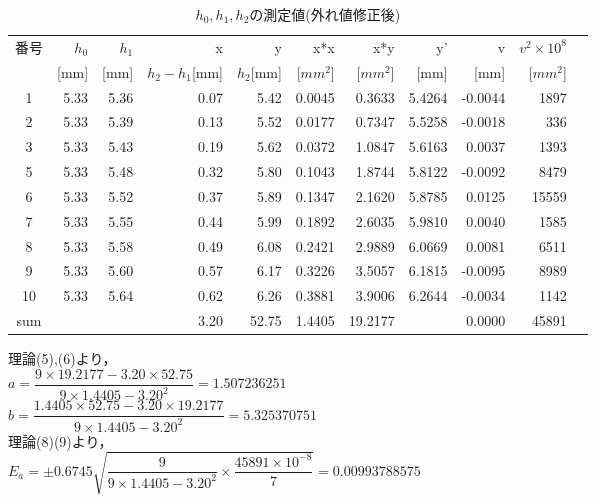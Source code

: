 \documentclass[a4paper,1pt]{jsarticle}
\begin{document}
\begin{table}[H]
  \caption{$h_0,h_1,h_2$の測定値(外れ値修正後)}
  \label{table:SpeedOfLight}
  \centering
  \begin{tabular}{|c||r|r|r|r|r|r|r|r|r|r|}
    \hline
    番号 & $h_0$ & $h_1$ & x & y & x*x & x*y & y' & v & $v^2\times10^8$\\
    &[mm] & [mm] & $h_2-h_1$[mm] & $h_2$[mm] & [$mm^2$] & [$mm^2$] & [mm] & [mm] & [$mm^2$]\\
    \hline \hline
    1 & 5.33 & 5.36 & 0.07 & 5.42 & 0.0045 & 0.3633 & 5.4264 & -0.0044 & 1897 \\
    2 & 5.33 & 5.39 & 0.13 & 5.52 & 0.0177 & 0.7347 & 5.5258 & -0.0018 & 336 \\
    3 & 5.33 & 5.43 & 0.19 & 5.62 & 0.0372 & 1.0847 & 5.6163 & 0.0037 & 1393 \\
    5 & 5.33 & 5.48 & 0.32 & 5.80 & 0.1043 & 1.8744 & 5.8122 & -0.0092 & 8479 \\
    6 & 5.33 & 5.52 & 0.37 & 5.89 & 0.1347 & 2.1620 & 5.8785 & 0.0125 & 15559 \\
    7 & 5.33 & 5.55 & 0.44 & 5.99 & 0.1892 & 2.6035 & 5.9810 & 0.0040 & 1585 \\
    8 & 5.33 & 5.58 & 0.49 & 6.08 & 0.2421 & 2.9889 & 6.0669 & 0.0081 & 6511 \\
    9 & 5.33 & 5.60 & 0.57 & 6.17 & 0.3226 & 3.5057 & 6.1815 & -0.0095 & 8989 \\
    10 & 5.33 & 5.64 & 0.62 & 6.26 & 0.3881 & 3.9006 & 6.2644 & -0.0034 & 1142 \\
    \hline
    sum &  &  & 3.20 & 52.75 & 1.4405 & 19.2177 &  & 0.0000 & 45891 \\
    \hline
  \end{tabular}


\end{table}

\clearpage

理論(5),(6)より，\\

$a=\dfrac{9\times19.2177-3.20\times52.75}{9\times1.4405-3.20^2}=1.507236251$\\

$b=\dfrac{1.4405\times52.75-3.20\times19.2177}{9\times1.4405-3.20^2}=5.325370751$\\

理論(8)(9)より，\\

$E_a=\pm0.6745\sqrt{\dfrac{9}{9\times1.4405-3.20^2}\times\dfrac{45891\times10^{-8}}{7}}=0.00993788575$\\
\end{document}
